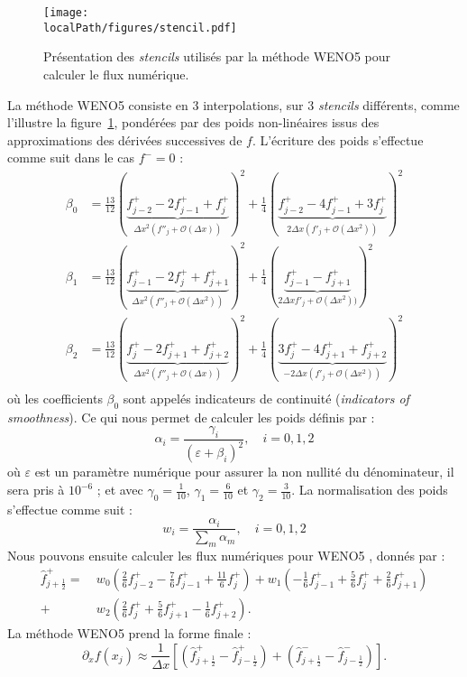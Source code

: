 \begin{figure}[h]
  \centering
  \texttt{[image: \\localPath/figures/stencil.pdf]}
  \caption{Présentation des \emph{stencils} utilisés par la méthode WENO5 pour calculer le flux numérique.}
  \label{fig:intro:stencil}
\end{figure}

La méthode WENO5 consiste en 3 interpolations, sur 3 \emph{stencils} différents, comme l'illustre la figure~\ref{fig:intro:stencil}, pondérées par des poids non-linéaires issus des approximations des dérivées successives de $f$. L'écriture des poids s'effectue comme suit dans le cas $f^-=0$ :
$$
  \begin{aligned}
    \beta_0 &= \frac{13}{12}( \underbrace{f^+_{j-2} - 2f^+_{j-1} + f^+_{j}}_{\Delta x^2(f''_{j} + \mathcal{O}(\Delta x))})^2   + \frac{1}{4}( \underbrace{  f^+_{j-2} - 4f^+_{j-1} + 3f^+_{j}  }_{ 2\Delta x ( f'_{j} + \mathcal{O}(\Delta x^2))})^2 \\
    \beta_1 &= \frac{13}{12}( \underbrace{f^+_{j-1} - 2f^+_{j}   + f^+_{j+1}}_{\Delta x^2(f''_{j} + \mathcal{O}(\Delta x^2))} )^2 + \frac{1}{4}( \underbrace{  f^+_{j-1} -               f^+_{j+1}}_{ 2\Delta x   f'_{j} + \mathcal{O}(\Delta x^2))})^2 \\
    \beta_2 &= \frac{13}{12}( \underbrace{f^+_{j}   - 2f^+_{j+1} + f^+_{j+2}}_{\Delta x^2(f''_{j} + \mathcal{O}(\Delta x))} )^2   + \frac{1}{4}( \underbrace{ 3f^+_{j}   - 4f^+_{j+1} +  f^+_{j+2}}_{-2\Delta x ( f'_{j} + \mathcal{O}(\Delta x^2))})^2 \\
  \end{aligned}
$$
où les coefficients $\beta_0$ sont appelés indicateurs de continuité (\emph{indicators of smoothness}). Ce qui nous permet de calculer les poids définis par :
$$
  \alpha_i = \frac{\gamma_i}{(\varepsilon + \beta_i)^2},\quad i=0,1,2
$$
où $\varepsilon$ est un paramètre numérique pour assurer la non nullité du dénominateur, il sera pris à $10^{-6}$ ; et avec $\gamma_0=\frac{1}{10}$, $\gamma_1=\frac{6}{10}$ et $\gamma_2=\frac{3}{10}$. La normalisation des poids s'effectue comme suit :
$$
  w_i = \frac{\alpha_i}{\sum_m \alpha_m},\quad i=0,1,2
$$
Nous pouvons ensuite calculer les flux numériques pour WENO5 \cite{Shu:2003}, donnés par :
$$
  \begin{aligned}
    \hat{f}_{j+\frac{1}{2}}^+   =\ & w_0\left(  \frac{2}{6}f^+_{j-2} - \frac{7}{6}f^+_{j-1} + \frac{11}{6}f^+_{j}   \right)
                                +    w_1\left( -\frac{1}{6}f^+_{j-1} + \frac{5}{6}f^+_{j}   +  \frac{2}{6}f^+_{j+1} \right) \\
                                +  & w_2\left(  \frac{2}{6}f^+_{j}   + \frac{5}{6}f^+_{j+1} -  \frac{1}{6}f^+_{j+2} \right).
  \end{aligned}
$$
La méthode WENO5 prend la forme finale :
$$
  \partial_xf(x_j) \approx \frac{1}{\Delta x}\left[ \left(\hat{f}_{j+\frac{1}{2}}^+ - \hat{f}_{j-\frac{1}{2}}^+ \right) + \left(\hat{f}_{j+\frac{1}{2}}^- - \hat{f}_{j-\frac{1}{2}}^- \right) \right].
$$

